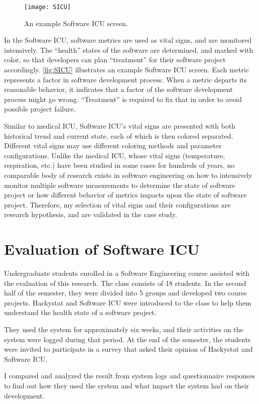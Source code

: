 \begin{figure}[htbp]
   \centering
   \texttt{[image: SICU]}
   \caption{An example Software ICU screen.}
   \label{fig:SICU}
\end{figure}


In the Software ICU, software metrics are used as vital signs, and are monitored intensively. The ``health'' states of the software are determined, and marked with color, so that developers can plan ``treatment'' for their software project accordingly. \autoref{fig:SICU} illustrates an example Software ICU screen. Each metric represents a factor in software development process. When a metric departs its reasonable behavior, it indicates that a factor of the software development process might go wrong. ``Treatment'' is required to fix that in order to avoid possible project failure.
 
Similar to medical ICU, Software ICU's vital signs are presented with both historical trend and current state, each of which is then colored separated. Different vital signs may use different coloring methods and parameter configurations. Unlike the medical ICU, whose vital signs (temperature, respiration, etc.) have been studied in some cases for hundreds of years, no comparable body of research exists in software engineering on how to intensively monitor multiple software measurements to determine the state of software project or how different behavior of metrics impacts upon the state of software project. Therefore, my selection of vital signs and their configurations are research hypothesis, and are validated in the case study.

\section{Evaluation of Software ICU}
Undergraduate students enrolled in a Software Engineering course assisted with the evaluation of this research. The class consists of 18 students. In the second half of the semester, they were divided into 5 groups and developed two course projects. Hackystat and Software ICU were introduced to the class to help them understand the health state of a software project. 

They used the system for approximately six weeks, and their activities on the system were logged during that period. At the end of the semester, the students were invited to participate in a survey that asked their opinion of Hackystat and Software ICU.

I compared and analyzed the result from system logs and questionnaire responses to find out how they used the system and what impact the system had on their development.


